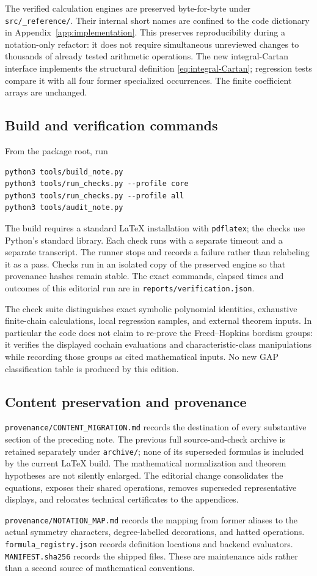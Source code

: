 The verified calculation engines are preserved byte-for-byte under \texttt{src/\_reference/}. Their internal short names are confined to the code dictionary in Appendix~\ref{app:implementation}. This preserves reproducibility during a notation-only refactor: it does not require simultaneous unreviewed changes to thousands of already tested arithmetic operations. The new integral-Cartan interface implements the structural definition \eqref{eq:integral-Cartan}; regression tests compare it with all four former specialized occurrences. The finite coefficient arrays are unchanged.

\subsection{Build and verification commands}
From the package root, run
\begin{verbatim}
python3 tools/build_note.py
python3 tools/run_checks.py --profile core
python3 tools/run_checks.py --profile all
python3 tools/audit_note.py
\end{verbatim}
The build requires a standard LaTeX installation with \texttt{pdflatex}; the checks use Python's standard library. Each check runs with a separate timeout and a separate transcript. The runner stops and records a failure rather than relabeling it as a pass. Checks run in an isolated copy of the preserved engine so that provenance hashes remain stable. The exact commands, elapsed times and outcomes of this editorial run are in \texttt{reports/verification.json}.

The check suite distinguishes exact symbolic polynomial identities, exhaustive finite-chain calculations, local regression samples, and external theorem inputs. In particular the code does not claim to re-prove the Freed--Hopkins bordism groups: it verifies the displayed cochain evaluations and characteristic-class manipulations while recording those groups as cited mathematical inputs. No new GAP classification table is produced by this edition.

\subsection{Content preservation and provenance}
\texttt{provenance/CONTENT\_MIGRATION.md} records the destination of every substantive section of the preceding note. The previous full source-and-check archive is retained separately under \texttt{archive/}; none of its superseded formulas is included by the current LaTeX build. The mathematical normalization and theorem hypotheses are not silently enlarged. The editorial change consolidates the equations, exposes their shared operations, removes superseded representative displays, and relocates technical certificates to the appendices.

\texttt{provenance/NOTATION\_MAP.md} records the mapping from former aliases to the actual symmetry characters, degree-labelled decorations, and hatted operations. \texttt{formula\_registry.json} records definition locations and backend evaluators. \texttt{MANIFEST.sha256} records the shipped files. These are maintenance aids rather than a second source of mathematical conventions.

